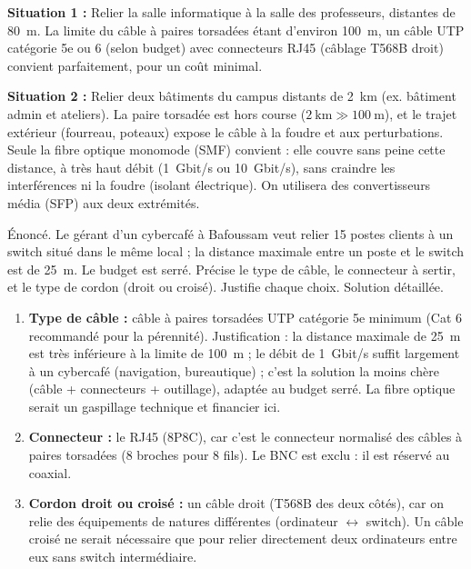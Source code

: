 \documentclass[11pt]{article}
\newcommand{\cle}[1]{{\popxbold\color{popdark}#1}}
\begin{document}
\begin{exemplebox}
\textbf{Situation 1 :} Relier la salle informatique à la salle des professeurs, distantes de \SI{80}{m}. La limite du câble à paires torsadées étant d'environ \SI{100}{m}, un câble UTP catégorie 5e ou 6 (selon budget) avec connecteurs RJ45 (câblage T568B droit) convient parfaitement, pour un coût minimal.

\textbf{Situation 2 :} Relier deux bâtiments du campus distants de \SI{2}{km} (ex. bâtiment admin et ateliers). La paire torsadée est hors course ($2\ \text{km} \gg 100\ \text{m}$), et le trajet extérieur (fourreau, poteaux) expose le câble à la foudre et aux perturbations. Seule la \cle{fibre optique monomode (SMF)} convient : elle couvre sans peine cette distance, à très haut débit (\SI{1}{Gbit/s} ou \SI{10}{Gbit/s}), sans craindre les interférences ni la foudre (isolant électrique). On utilisera des convertisseurs média (SFP) aux deux extrémités.
\end{exemplebox}

\begin{exoresolu}
Énoncé. Le gérant d'un cybercafé à Bafoussam veut relier 15 postes clients à un switch situé dans le même local ; la distance maximale entre un poste et le switch est de \SI{25}{m}. Le budget est serré. Précise le type de câble, le connecteur à sertir, et le type de cordon (droit ou croisé). Justifie chaque choix.
\tcblower
Solution détaillée.
\begin{enumerate}
  \item \textbf{Type de câble :} câble à \cle{paires torsadées} UTP catégorie 5e minimum (Cat 6 recommandé pour la pérennité). Justification : la distance maximale de \SI{25}{m} est très inférieure à la limite de \SI{100}{m} ; le débit de \SI{1}{Gbit/s} suffit largement à un cybercafé (navigation, bureautique) ; c'est la solution la moins chère (câble + connecteurs + outillage), adaptée au budget serré. La fibre optique serait un gaspillage technique et financier ici.
  \item \textbf{Connecteur :} le \cle{RJ45} (8P8C), car c'est le connecteur normalisé des câbles à paires torsadées (8 broches pour 8 fils). Le BNC est exclu : il est réservé au coaxial.
  \item \textbf{Cordon droit ou croisé :} un \cle{câble droit} (T568B des deux côtés), car on relie des équipements de natures différentes (ordinateur $\leftrightarrow$ switch). Un câble croisé ne serait nécessaire que pour relier directement deux ordinateurs entre eux sans switch intermédiaire.
\end{enumerate}
\end{exoresolu}
\end{document}
